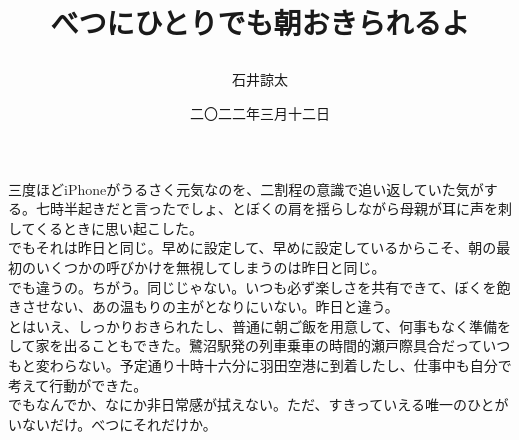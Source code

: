 \documentclass{tarticle}
\title{\raggedright\Large べつにひとりでも朝おきられるよ}
\author{石井諒太}
\date{二〇二二年三月十二日}
\begin{document}
\maketitle
三度ほどiPhoneがうるさく元気なのを、二割程の意識で追い返していた気がする。七時半起きだと言ったでしょ、とぼくの肩を揺らしながら母親が耳に声を刺してくるときに思い起こした。
\\[10mm]

でもそれは昨日と同じ。早めに設定して、早めに設定しているからこそ、朝の最初のいくつかの呼びかけを無視してしまうのは昨日と同じ。
\\[10mm]

でも違うの。ちがう。同じじゃない。いつも必ず楽しさを共有できて、ぼくを飽きさせない、あの温もりの主がとなりにいない。昨日と違う。
\\[10mm]

とはいえ、しっかりおきられたし、普通に朝ご飯を用意して、何事もなく準備をして家を出ることもできた。鷺沼駅発の列車乗車の時間的瀬戸際具合だっていつもと変わらない。予定通り十時十六分に羽田空港に到着したし、仕事中も自分で考えて行動ができた。
\\[10mm]

でもなんでか、なにか非日常感が拭えない。ただ、すきっていえる唯一のひとがいないだけ。べつにそれだけか。
\end{document}
